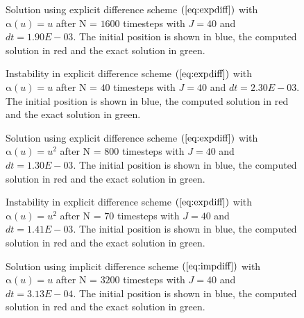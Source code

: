\documentclass[11pt]{article}
\newcommand{\al}{\mathrm{\alpha}}
\begin{document}
% 
\begin{figure}[h!]
 
  \caption{Solution using explicit difference scheme $(\ref{eq:expdiff})$ with $\al(u) = u$ after N = $1600$ timesteps with $J = 40$ and $dt = 1.90E-03$. The initial position is shown in blue, the computed solution in red and the exact solution in green.}
  \label{fig:instability1}
\end{figure}
\newpage
\begin{figure}[h!]
 
  \caption{Instability in explicit difference scheme $(\ref{eq:expdiff})$ with $\al(u) = u$ after N = $40$ timesteps with $J = 40$ and $dt = 2.30E-03$. The initial position is shown in blue, the computed solution in red and the exact solution in green.}
  \label{fig:instability}
\end{figure}
\newpage
\begin{figure}[h!]
 
  \caption{Solution using explicit difference scheme $(\ref{eq:expdiff})$ with $\al(u) = u^2$ after N = $800$ timesteps with $J = 40$ and $dt = 1.30E-03$. The initial position is shown in blue, the computed solution in red and the exact solution in green.}
  \label{fig:instability2}
\end{figure}
\newpage
\begin{figure}[h!]
 
  \caption{Instability in explicit difference scheme $(\ref{eq:expdiff})$ with $\al(u) = u^2$ after N = $70$ timesteps with $J = 40$ and $dt = 1.41E-03$. The initial position is shown in blue, the computed solution in red and the exact solution in green.}
  \label{fig:instability3}
\end{figure}
\newpage
\begin{figure}[h!]
 
  \caption{Solution using implicit difference scheme $(\ref{eq:impdiff})$ with $\al(u) = u$ after N = $3200$ timesteps with $J = 40$ and $dt = 3.13E-04$. The initial position is shown in blue, the computed solution in red and the exact solution in green.}
  \label{fig:impdiff1}
\end{figure}
\newpage
\nocite{Morton1}


\newpage
\appendix
\end{document}
